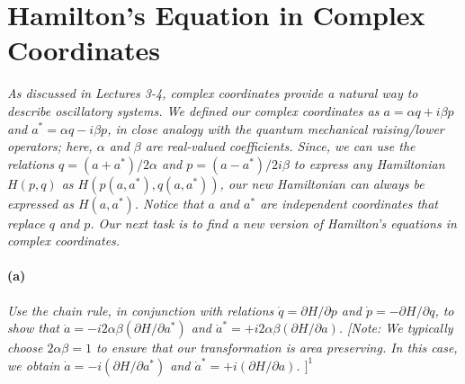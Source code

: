 \documentclass[hyperref, a4paper]{article}
\begin{document}
\section{Hamilton's Equation in Complex Coordinates}

\textit{
    As discussed in Lectures 3-4, complex coordinates provide a natural way to describe oscillatory systems. We defined our complex coordinates as $a=\alpha q+i \beta p$ and $a^*=\alpha q-i \beta p$, in close analogy with the quantum mechanical raising/lower operators; here, $\alpha$ and $\beta$ are real-valued coefficients. Since, we can use the relations $q=\left(a+a^*\right) / 2 \alpha$ and $p=\left(a-a^*\right) / 2 i \beta$ to express any Hamiltonian $H(p, q)$ as $H\left(p\left(a, a^*\right), q\left(a, a^*\right)\right)$, our new Hamiltonian can always be expressed as $H\left(a, a^*\right)$. Notice that $a$ and $a^*$ are independent coordinates that replace $q$ and $p$. Our next task is to find a new version of Hamilton's equations in complex coordinates.
}

\paragraph*{(a)} \textit{
    Use the chain rule, in conjunction with relations $\dot{q}=\partial H / \partial p$ and $\dot{p}=-\partial H / \partial q$, to show that $\dot{a}=-i 2 \alpha \beta\left(\partial H / \partial a^*\right)$ and $\dot{a}^*=+i 2 \alpha \beta(\partial H / \partial a)$.
    [Note: We typically choose $2 \alpha \beta=1$ to ensure that our transformation is area preserving. In this case, we obtain $\dot{a}=-i\left(\partial H / \partial a^*\right)$ and $\dot{a}^*=+i(\partial H / \partial a)$. $]^1$
}
\end{document}
